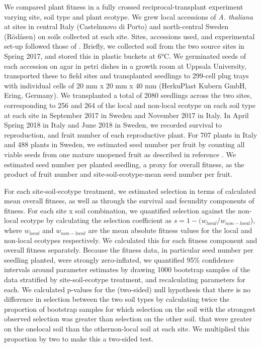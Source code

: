 \documentclass[twocolumn,twoside,lettersize]{article}
\begin{document}
We compared plant fitness in a fully crossed reciprocal-transplant experiment varying site, soil type and plant ecotype. We grew local accessions of  \textit{A. thaliana} at sites in central Italy (Castelnuovo di Porto) and north-central Sweden (R{\"o}d{\aa}sen) on soils collected at each site. Sites, accessions used, and experimental set-up followed those of  \cite{Agren2012-ga}. Briefly, we collected soil from the two source sites in Spring 2017, and stored this in plastic buckets at 6°C. We germinated seeds of each accession on agar in petri dishes in a growth room at Uppsala University, transported these to field sites and transplanted seedlings to 299-cell plug trays with individual cells of 20 mm x 20 mm x 40 mm (HerkuPlast Kubern GmbH, Ering, Germany). We transplanted a total of 2080 seedlings across the two sites, corresponding to 256 and 264 of the local and non-local ecotype on each soil type at each site in September 2017 in Sweden and November 2017 in Italy. In April Spring 2018 in Italy and June 2018 in Sweden, we recorded survival to reproduction, and fruit number of each reproductive plant. For 707 plants in Italy and 488 plants in Sweden, we estimated seed number per fruit by counting all viable seeds from one mature unopened fruit as described in reference \cite{Ellis2021-rw}. We estimated seed number per planted seedling, a proxy for overall fitness, as the product of fruit number and site-soil-ecotype-mean seed number per fruit.

For each site-soil-ecotype treatment, we estimated selection in terms of calculated mean overall fitness, as well as through the survival and fecundity components of fitness. For each site x soil combination, we quantified selection against the non-local ecotype by calculating the selection coefficient as $s=1 - (w_{local}/w_{non-local}$), where $w_{local}$ and $w_{non-local}$ are the mean absolute fitness values for the local and non-local ecotypes respectively. We calculated this for each fitness component and overall fitness separately. Because the fitness data, in particular seed number per seedling planted, were strongly zero-inflated, we quantified 95\% confidence intervals around parameter estimates by drawing 1000 bootstrap samples of the data stratified by site-soil-ecotype treatment, and recalculating parameters for each. We calculated p-values for the (two-sided) null hypothesis that there is no difference in selection between the two soil types by calculating twice the proportion of bootstrap samples for which selection on the soil with the strongest observed selection was greater than selection on the other soil. that were greater on the onelocal soil than the othernon-local soil at each site. We multiplied this proportion by two to make this a two-sided test.
\end{document}
